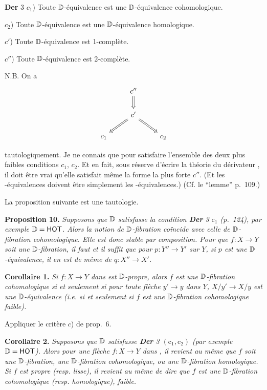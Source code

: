 \textbf{Der} 3 $c_1$) Toute $\mathbb{D}$-équivalence est une $\mathbb{D}$-équivalence cohomologique.

$c_2$) Toute $\mathbb{D}$-équivalence est une $\mathbb{D}$-équivalence homologique.

$c'$) Toute $\mathbb{D}$-équivalence est 1-complète.

$c''$) Toute $\mathbb{D}$-équivalence est 2-complète.

N.B. On a
\[
\begin{tikzcd}
& c'' \arrow[d, Rightarrow] & \\
& c' \arrow[dl, Rightarrow] \arrow[dr, Rightarrow] & \\
c_1 & & c_2
\end{tikzcd}
\]

tautologiquement. Je ne connais que \HOT{} pour satisfaire l'ensemble des deux plus faibles conditions $c_1$, $c_2$. Et en fait, sous réserve d'écrire la théorie du dérivateur \HOT, il doit être vrai qu'elle satisfait même la forme la plus forte $c''$. (Et les \HOT-équivalences doivent être simplement les \Hot-équivalences.) (Cf. le “lemme” p.~109.)

La proposition suivante est une tautologie.

\noindent\textbf{Proposition 10.} \textit{Supposons que $\mathbb{D}$ satisfasse la condition \textup{\textbf{Der} 3 $\mathrm{c}_1$ (p.~124),} par exemple $\mathbb{D} = \text{\ensuremath{\mathsf{HOT}}}$. Alors la notion de $\mathbb{D}$-fibration coïncide avec celle de $\mathbb{D}$-fibration cohomologique. Elle est donc stable par composition. Pour que $f : X \to Y$ soit une $\mathbb{D}$-fibration, il faut et il suffit que pour $p : Y'' \to Y'$ sur $Y$, si $p$ est une $\mathbb{D}$-équivalence, il en est de même de $q : X'' \to X'$.}

\noindent\textbf{Corollaire 1.} \textit{Si $f : X \to Y$ dans \textup{\Dia} est $\mathbb{D}$-propre, alors $f$ est une $\mathbb{D}$-fibration cohomologique si et seulement si pour toute flèche $y' \to y$ dans $Y$, $X/y' \to X/y$ est une $\mathbb{D}$-équivalence \textup{(i.e.} si et seulement si $f$ est une $\mathbb{D}$-fibration cohomologique faible\textup{).}}

Appliquer le critère $c$) de prop.~6.


\noindent\textbf{Corollaire 2.} \textit{Supposons que $\mathbb{D}$ satisfasse \textup{\textbf{Der} 3 $(\mathrm{c}_1, \mathrm{c}_2)$ (par exemple $\mathbb{D} = \text{\ensuremath{\mathsf{HOT}}}$).} Alors pour une flèche $f : X \to Y$ dans \textup{\Dia}, il revient au même que $f$ soit une $\mathbb{D}$-fibration, une $\mathbb{D}$-fibration cohomologique, ou une $\mathbb{D}$-fibration homologique. Si $f$ est propre \textup{(resp.} lisse\textup{),} il revient au même de dire que $f$ est une $\mathbb{D}$-fibration cohomologique \textup{(resp.} homologique\textup{),} faible.}

